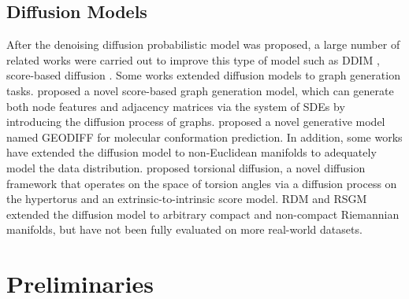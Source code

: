\documentclass[letterpaper]{article} %
\begin{document}
\subsection{Diffusion Models}
After the denoising diffusion probabilistic model \cite{ho2020denoising} was proposed, a large number of related works were carried out to improve this type of model such as DDIM \cite{DDIM2020}, score-based diffusion \cite{song2020score}. 
Some works extended diffusion models to graph generation tasks.
\citet{jo2022score} proposed a novel score-based graph generation model, which can generate both node features and adjacency matrices via the system of SDEs by introducing the diffusion process of graphs.
\citet{GeoDiff2022} proposed a novel generative model named GEODIFF for molecular conformation prediction. 
In addition, some works have extended the diffusion model to non-Euclidean manifolds to adequately model the data distribution.
\citet{Torsional2022} proposed torsional diffusion, a novel diffusion framework that operates on the space of torsion angles via a diffusion process on the hypertorus and an extrinsic-to-intrinsic score model. 
RDM \cite{huang2022riemannian} and RSGM \cite{de2022riemannian} extended the diffusion model to arbitrary compact and non-compact Riemannian manifolds, but have not been fully evaluated on more real-world datasets.

\section{Preliminaries}
\end{document}

